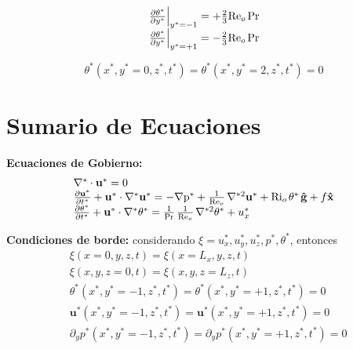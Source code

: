 \begin{align}
\begin{array}{l}
    \left. \frac{\partial \theta^*}{\partial y^*} \right\vert_{y^*=-1} = + \frac{2}{3} \text{Re}_o \hspace{0.5mm} \text{Pr} \\
    \left. \frac{\partial \theta^*}{\partial y^*} \right\vert_{y^*=+1} = - \frac{2}{3} \text{Re}_o \hspace{0.5mm} \text{Pr} 
\end{array}
\label{eq:neumann_adim}
\end{align}

\begin{equation}
\theta^*(x^*,y^*=0,z^*,t^*) = \theta^*(x^*,y^*=2,z^*,t^*) = 0
\label{eq:dirichlet_adim_theta}
\end{equation}



\section{Sumario de Ecuaciones}

\textbf{Ecuaciones de Gobierno:}
\begin{equation}
\begin{array}{l}
    \nabla^* \cdot \mathbf{u^*} = 0 \\
    \frac{\partial \mathbf{u^*}}{\partial t^*} + \mathbf{u^*} \cdot \nabla^* \mathbf{u^*} = 
    -\nabla \text{p}^* + \frac{1}{\text{Re}_o} \hspace{0.5mm} \nabla^{*2} \mathbf{u^*} + \text{Ri}_o \hspace{0.5mm} \theta^* \hspace{0.5mm} \mathbf{\hat{g}} + f \mathbf{\hat{x}} \\
    \frac{\partial \theta^*}{\partial t^*} + \mathbf{u^*} \cdot \nabla^* \theta^* = 
    \frac{1}{\text{Pr}}\hspace{0.5mm}  \frac{1}{\text{Re}_o} \hspace{0.5mm} \nabla^{*2} \theta^* + u_x^* 
\end{array}
\label{eq:gob_system_res1}
\end{equation}

\textbf{Condiciones de borde:} considerando $\xi= u^*_x, u^*_y, u^*_z, p^*, \theta^*$, entonces
\begin{align}
&\xi(x=0,y,z,t) = \xi(x=L_x,y,z,t) 
	\label{eq:bc_1} \\
&\xi(x,y,z=0,t) = \xi(x,y,z=L_z,t) 
	\label{eq:bc_2} \\
&\theta^*(x^*,y^*=-1,z^*,t^*)       = \theta^*(x^*,y^*=+1,z^*,t^*) = 0
	\label{eq:bc_3} \\
&\mathbf{u^*}(x^*,y^*=-1,z^*,t^*)   = \mathbf{u^*}(x^*,y^*=+1,z^*,t^*) = 0
	\label{eq:bc_4} \\
&\partial_y p^*(x^*,y^*=-1,z^*,t^*) = \partial_y p^*(x^*,y^*=+1,z^*,t^*) = 0
	\label{eq:bc_5} \\
\end{align}

